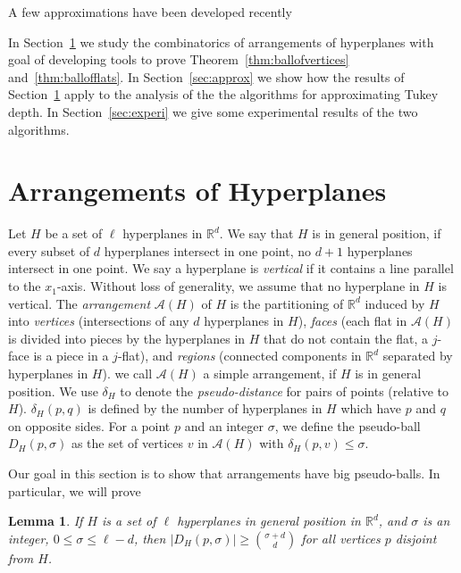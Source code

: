 \documentclass{patmorin}
\newtheorem{lemma}{Lemma}%
\begin{document}
A few approximations have been developed recently

In Section~\ref{sec:arran} we study the combinatorics of arrangements of hyperplanes with goal of developing tools to prove Theorem~\ref{thm:ballofvertices} and~\ref{thm:ballofflats}. In Section~\ref{sec:approx} we show how the results of Section~\ref{sec:arran} apply to the analysis of the the algorithms for approximating Tukey depth. In Section~\ref{sec:experi} we give some experimental results of the two algorithms.

\section{Arrangements of Hyperplanes}
\label{sec:arran}

Let $H$ be a set of $\ell$ hyperplanes in $\mathbb{R}^{d}$. We say that $H$ is in general position, if every subset of $d$ hyperplanes intersect in one point, no $d + 1$ hyperplanes intersect in one point. We say a hyperplane is \emph{vertical} if it contains a line parallel to the $x_{1}$-axis. Without loss of generality, we assume that no hyperplane in $H$ is vertical. The \emph{arrangement} $\mathcal{A}(H)$ of $H$ is the partitioning of $\mathbb{R}^{d}$ induced by $H$ into \emph{vertices} (intersections of any $d$ hyperplanes in $H$), \emph{faces} (each flat in $\mathcal{A}(H)$ is divided into pieces by the hyperplanes in $H$ that do not contain the flat, a $j$-face is a piece in a $j$-flat), and \emph{regions} (connected components in $\mathbb{R}^{d}$ separated by hyperplanes in $H$). we call $\mathcal{A}(H)$ a simple arrangement, if $H$ is in general position. We use $\delta_{H}$ to denote the \emph{pseudo-distance} for pairs of points (relative to $H$). $\delta_{H}(p,q)$ is defined by the number of hyperplanes in $H$ which have $p$ and $q$ on opposite sides. For a point $p$ and an integer $\sigma$, we define the pseudo-ball $D_{H}(p,\sigma)$ as the set of vertices $v$ in $\mathcal{A}(H)$ with $\delta_{H}(p,v) \leq \sigma$.

Our goal in this section is to show that arrangements have big pseudo-balls. In particular, we will prove
\begin{lemma}
\label{lem:ballofvertices}
  If $H$ is a set of $\ell$ hyperplanes in general position in $\mathbb{R}^{d}$, and $\sigma$ is an integer, $0 \leq \sigma \leq \ell - d$, then $|D_{H}(p,\sigma)| \geq \binom{\sigma+d}{d}$ for all vertices $p$ disjoint from $H$.
\end{lemma}
\end{document}
